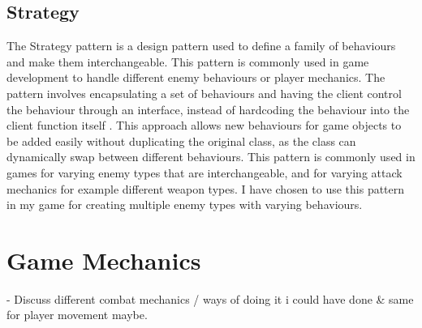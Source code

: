 \documentclass[]{final_report}
\begin{document}
\subsection{Strategy}\label{strategy}
The Strategy pattern is a design pattern used to define a family of behaviours and make them interchangeable. This pattern is commonly used in game development to handle different enemy behaviours or player mechanics. The pattern involves encapsulating a set of behaviours and having the client control the behaviour through an interface, instead of hardcoding the behaviour into the client function itself \cite{Doran2017}. This approach allows new behaviours for game objects to be added easily without duplicating the original class, as the class can dynamically swap between different behaviours. This pattern is commonly used in games for varying enemy types that are interchangeable, and for varying attack mechanics for example different weapon types. I have chosen to use this pattern in my game for creating multiple enemy types with varying behaviours.

\section{Game Mechanics}
- Discuss different combat mechanics / ways of doing it i could have done \& same for player movement maybe.
\end{document}
